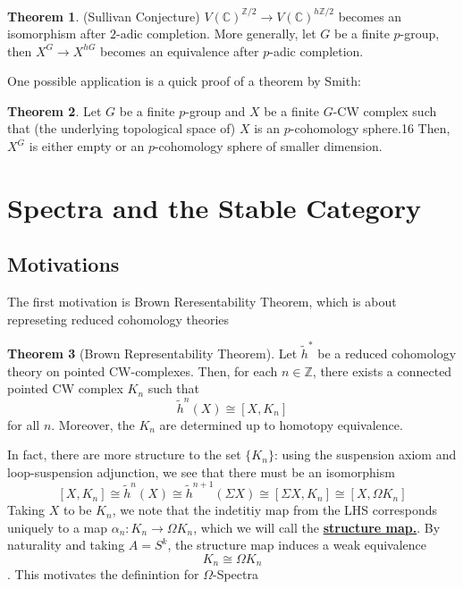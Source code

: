 \documentclass{article}
\theoremstyle{definition}
\newtheorem{theorem}{Theorem}[section]
\theoremstyle{definition}
\theoremstyle{definition}
\theoremstyle{definition}
\theoremstyle{definition}
\theoremstyle{definition}
\theoremstyle{definition}
\begin{document}
\begin{tcolorbox}[colback=red!5!white,colframe=red!30!white]
\begin{theorem}
(Sullivan Conjecture) $V(\mathbb{C})^{\mathbb{Z}/2}\to V(\mathbb{C})^{h \mathbb{Z}/2}$ becomes an isomorphism after $2$-adic completion. More generally, let $G$ be a finite $p$-group, then $X^G\to X^{hG}$ becomes an equivalence after $p$-adic completion. 
\end{theorem}
\end{tcolorbox}




One possible application is a quick proof of a theorem by Smith: 


\begin{tcolorbox}[colback=red!5!white,colframe=red!30!white]
\begin{theorem}
    Let $G$ be a finite $p$-group and $X$ be a finite $G$-CW complex such that (the underlying topological space of) $X$ is an $p$-cohomology sphere.16 Then, $X^G$ is either empty or an $p$-cohomology sphere of smaller dimension.
\end{theorem}
\end{tcolorbox}











\section{Spectra and the Stable Category}
\subsection{Motivations}
The first motivation is Brown Reresentability Theorem, which is about represeting reduced cohomology theories 

\begin{tcolorbox}[colback=red!5!white,colframe=red!30!white]
\begin{theorem}[Brown Representability Theorem]
Let $\tilde{h}^*$ be a reduced cohomology theory on pointed CW-complexes. Then, for each $n\in \mathbb{Z}$, there exists a connected pointed CW complex $K_n$ such that 
\[\tilde{h}^n(X)\cong [X,K_n]\]
for all $n$. Moreover, the $K_n$ are determined up to homotopy equivalence. 
\end{theorem}
\end{tcolorbox}
In fact, there are more structure to the set $\{K_n\}$: using the suspension axiom and loop-suspension adjunction, we see that there must be an isomorphism 
\[[X,K_n]\cong \tilde{h}^n(X)\cong \tilde{h}^{n+1}(\Sigma X)\cong [\Sigma X,K_n]\cong [X,\Omega K_n]\]
Taking $X$ to be $K_n$, we note that the indetitiy map from the LHS corresponds uniquely to a map $\alpha_n: K_n\to \Omega K_n$, which we will call the \underline{\textbf{structure map.}}. By naturality and taking $A=S^k$, the structure map induces a weak equivalence 
\[K_n\cong  \Omega K_n\]
. This motivates the definintion for $\Omega$-Spectra
\end{document}
